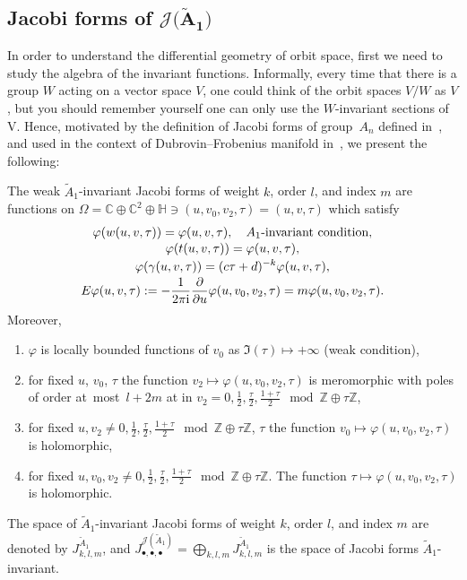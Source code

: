 \documentclass[10pt,a4paper]{amsart}
\numberwithin{equation}{section}
\newcommand{\Ja}{\mathcal{J}}
\begin{document}
\subsection[Jacobi forms of J(A1)]{Jacobi forms of $\boldsymbol{\Ja\big(\tilde A_1\big)}$}\label{Jacobi forms Jtildea1}
In order to understand the differential geometry of orbit space, first we need to study the algebra of the invariant functions. Informally, every time that there is a group $W$ acting on a vector space $V$, one could think of the orbit spaces $V/W$ as $V$, but you should remember yourself one can only use the $W$-invariant sections of V. Hence, motivated by the definition of Jacobi forms of group~$A_n$ defined in~\cite{K.Wirthmuller}, and used in the context of Dubrovin--Frobenius manifold in~\cite{BertolaM.1,BertolaM.2}, we present the following:

\begin{Definition}\label{meromorphic jacobi forms}
The weak $\tilde A_1$-invariant Jacobi forms of weight $k$, order $l$, and index $m$ are functions on $\Omega=\mathbb{C}\oplus\mathbb{C}^2\oplus\mathbb{H}\ni (u,v_0,v_2,\tau)=(u,v,\tau)$ which satisfy
\begin{gather}
\varphi(w(u,v,\tau))=\varphi(u,v,\tau),\quad \textrm{$A_1$-invariant condition},\nonumber
\\[-.5ex]
\varphi(t(u,v,\tau))=\varphi(u,v,\tau),\nonumber
\\[-.5ex]
\varphi(\gamma(u,v,\tau))=(c\tau+d)^{-k}\varphi(u,v,\tau),\nonumber
\\[-.5ex]
E\varphi(u,v,\tau):=-\frac{1}{2\pi {\rm i}}\frac{\partial}{\partial u}\varphi(u,v_0,v_2,\tau)=m\varphi(u,v_0,v_2,\tau).
\label{jacobiform}
\end{gather}
Moreover,
\begin{enumerate}\itemsep=0pt
\item[1)] $\varphi$ is locally bounded functions of $v_0$ as $\Im(\tau)\mapsto +\infty$ (weak condition),
\item[2)] for fixed $u$, $v_0$, $\tau$ the function $v_{2}\mapsto \varphi(u,v_0,v_2,\tau)$ is meromorphic with poles of order at~most~$l+2m$ at in $v_{2}=0,\frac{1}{2},\frac{\tau}{2},\frac{1+\tau}{2} \mod\mathbb{Z}\oplus\tau\mathbb{Z}$,
\item[3)] for fixed $u,v_2\neq 0,\frac{1}{2},\frac{\tau}{2},\frac{1+\tau}{2} \mod \mathbb{Z}\oplus\tau\mathbb{Z}$, $\tau$ the function $v_{0}\mapsto \varphi(u,v_0,v_2,\tau)$ is holo\-morphic,
\item[4)] for fixed $u,v_0,v_2\neq 0,\frac{1}{2},\frac{\tau}{2},\frac{1+\tau}{2}\mod \mathbb{Z}\oplus\tau\mathbb{Z}$. The function $\tau\mapsto \varphi(u,v_0,v_2,\tau)$ is holo\-morphic.
\end{enumerate}
The space of $\tilde A_1$-invariant Jacobi forms of weight $k$, order $l$, and index $m$ are denoted by $J_{k,l,m}^{\tilde A_1}$, and $J_{\bullet,\bullet,\bullet}^{\Ja(\tilde A_1)}=\bigoplus _{k,l,m}J_{k,l,m}^{\tilde A_1}$ is the space of Jacobi forms $\tilde A_1$-invariant.
\end{Definition}
\end{document}
